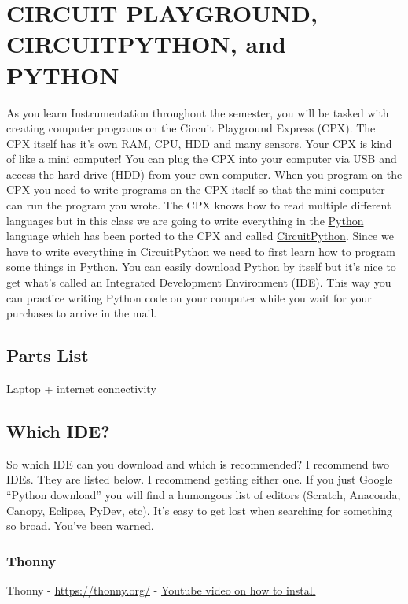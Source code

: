 \newpage

\section{CIRCUIT PLAYGROUND, CIRCUITPYTHON, and PYTHON}

As you learn Instrumentation throughout the semester, you will be
tasked with creating computer programs on the Circuit Playground
Express (CPX). The CPX itself has it’s own RAM, CPU, HDD and many
sensors. Your CPX is kind of like a mini computer! You can plug the
CPX into your computer via USB and access the hard drive (HDD) from
your own computer. When you program on the CPX you need to write
programs on the CPX itself so that the mini computer can run the
program you wrote. The CPX knows how to read multiple different
languages but in this class we are going to write everything in the
\href{https://www.python.org/}{Python} language which has been ported
to the CPX and called
\href{https://circuitpython.org/}{CircuitPython}. Since we have to
write everything in CircuitPython we 
need to first learn how to program some things in Python. You can
easily download Python by itself but it’s nice to get what’s called an
Integrated Development Environment (IDE). This way you can practice
writing Python code on your computer while you wait for your purchases
to arrive in the mail. 

\subsection{Parts List}
Laptop + internet connectivity

\subsection{Which IDE?}

So which IDE can you download and which is recommended? I recommend
two IDEs. They are listed below. I recommend getting either one. If
you just Google “Python download” you will find a humongous list of
editors (Scratch, Anaconda, Canopy, Eclipse, PyDev, etc). It’s easy to
get lost when searching for something so broad. You’ve been warned.

\subsubsection{Thonny}

Thonny - \url{https://thonny.org/} -
\href{https://www.youtube.com/watch?v=qaxukpYRqfA&list=PL_D7_GvGz-v1RsDs_OdNW65qRjEjmpfQx&index=14}{Youtube
  video on how to install}

